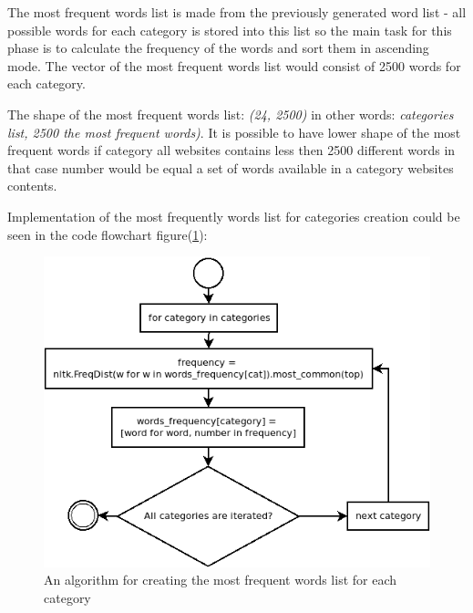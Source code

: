 The most frequent words list is made from the previously generated word list - all possible words for each category is stored into this list so the main task for this phase is to calculate the frequency of the words and sort them in ascending mode. The vector of the most frequent words list would consist of 2500 words for each category. 

The shape of the most frequent words list: \textit{(24, 2500)} in other words: \textit{categories list, 2500 the most frequent words)}. It is possible to have lower shape of the most frequent words if category all websites contains less then 2500 different words in that case number would be equal a set of words available in a category websites contents.


Implementation of the most frequently words list for categories creation could be seen in the code flowchart figure(\ref{fig:category_words_frequency}):
\begin{figure}[H]
    \centering
    \includegraphics[width=1\textwidth]{Pictures/category_words_frequency.png}
    \caption{\label{fig:category_words_frequency}{} An algorithm for creating the most frequent words list for each category }
\end{figure}

